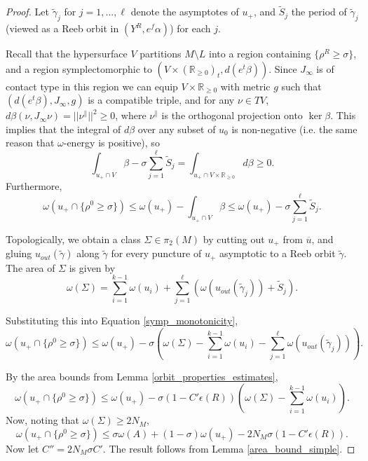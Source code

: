 \documentclass{article}
\numberwithin{equation}{section}
\numberwithin{figure}{section}
\begin{document}
\begin{proof}
Let $\tilde{\gamma}_j$ for $j=1,...,\ell$ denote the asymptotes of $u_+$, and $\tilde{S}_j$ the period of $\tilde{\gamma}_j$ (viewed as a Reeb orbit in $(Y^R,e^f\alpha)$) for each $j$.

Recall that the hypersurface $V$ partitions $M\setminus L$ into a region containing $\{\rho^R\geq \sigma\}$, and a region symplectomorphic to $(V\times (\mathbb{R}_{\geq 0})_t,d(e^t\beta))$.
Since $J_\infty$ is of contact type in this region we can equip $V\times \mathbb{R}_{\geq 0}$ with metric $g$ such that $(d(e^t\beta),J_\infty,g)$ is a compatible triple, and for any $\nu\in TV$, $d\beta(\nu,J_\infty\nu)=||\nu^{\parallel}||^2\geq 0$, where $\nu^{\parallel}$ is the orthogonal projection onto $\ker\beta$. This implies that the integral of $d\beta$ over any subset of $u_0$ is non-negative (i.e. the same reason that $\omega$-energy is positive), so
    \begin{equation}
        \int_{u_+\cap V}\beta-\sigma\sum_{j=1}^\ell\tilde{S}_j=\int_{u_+\cap V\times \mathbb{R}_{\geq 0}}d\beta\geq 0.
    \end{equation}
Furthermore,
\begin{equation}
    \omega(u_+\cap \{\rho^0\geq \sigma\})\leq \omega(u_+)-\int_{u_+\cap V}\beta\leq \omega(u_+)-\sigma\sum_{j=1}^\ell\tilde{S}_j.
    \label{symp_monotonicity}
\end{equation}

Topologically, we obtain a class $\Sigma\in\pi_2(M)$ by cutting out $u_+$ from $\overline{u}$, and gluing $u_{out}(\tilde{\gamma})$ along $\tilde{\gamma}$ for every puncture of $u_+$ asymptotic to a Reeb orbit $\tilde{\gamma}$. The area of $\Sigma$ is given by
\begin{equation}
\omega(\Sigma)=\sum_{i=1}^{k-1}\omega(u_i)+\sum_{j=1}^\ell(\omega(u_{out}(\tilde{\gamma}_j))+\tilde{S}_j).
\end{equation}

Substituting this into Equation \eqref{symp_monotonicity},
\begin{equation}
\omega(u_+\cap \{\rho^0\geq \sigma\})\leq \omega(u_+)-\sigma\left(\omega(\Sigma)-\sum_{i=1}^{k-1}\omega(u_i)-\sum_{j=1}^\ell\omega(u_{out}(\tilde{\gamma}_j))\right).   
\end{equation}

By the area bounds from Lemma \ref{orbit_properties_estimates},
\begin{equation}
\omega(u_+\cap \{\rho^0\geq \sigma\})\leq \omega(u_+)-\sigma(1-C'\epsilon(R))\left(\omega(\Sigma)-\sum_{i=1}^{k-1}\omega(u_i)\right).  
\end{equation}
Now, noting that $\omega(\Sigma)\geq 2N_M$,
\begin{equation}
\omega(u_+\cap \{\rho^0\geq \sigma\})\leq \sigma\omega(A)+(1-\sigma)\omega(u_+)-2N_M\sigma(1-C'\epsilon(R)). 
\end{equation}
Now let $C''=2N_M\sigma C'$. The result follows from Lemma \ref{area_bound_simple}.
\end{proof}
\end{document}
